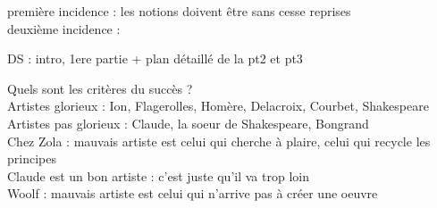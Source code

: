 \documentclass[a4paper,twocolumn,landscape]{article}
\begin{document}
\noindent
première incidence : les notions doivent être sans cesse reprises \\
deuxième incidence : 

DS : intro, 1ere partie + plan détaillé de la pt2 et pt3

\noindent
Quels sont les critères du succès ? \\
Artistes glorieux : Ion, Flagerolles, Homère, Delacroix, Courbet, Shakespeare\\
Artistes pas glorieux : Claude, la soeur de Shakespeare, Bongrand\\

\noindent
Chez Zola : mauvais artiste est celui qui cherche à plaire, celui qui recycle les principes\\
Claude est un bon artiste : c'est juste qu'il va trop loin\\
Woolf : mauvais artiste est celui qui n'arrive pas à créer une oeuvre\\
\end{document}
